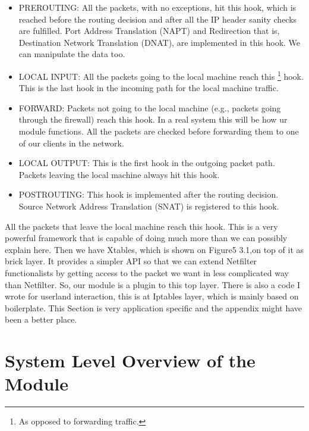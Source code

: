\documentclass[11pt,left=2cm,bottom=2cm,oneside]{book}
\begin{document}
\begin{itemize}
\item PREROUTING: All the packets, with no exceptions, hit this hook, which
is reached before the routing decision and after all the IP header sanity
checks are fulfilled. Port Address Translation (NAPT) and Redirection
that is, Destination Network Translation (DNAT), are implemented in
this hook. We can manipulate the data too.
\item LOCAL INPUT: All the packets going to the local machine reach this
\footnote{As opposed to forwarding traffic.}
hook. This is the last hook in the incoming path for the local machine
traffic.
\item FORWARD: Packets not going to the local machine (e.g., packets going
through the firewall) reach this hook. In a real system this will be how
ur module functions. All the packets are checked before forwarding them
to one of our clients in the network.
\item LOCAL OUTPUT: This is the first hook in the outgoing packet path.
Packets leaving the local machine always hit this hook.
\item POSTROUTING: This hook is implemented after the routing decision.
Source Network Address Translation (SNAT) is registered to this hook.
\end{itemize}
All the packets that leave the local machine reach this hook.
 This is a very powerful framework that is capable of doing much more than
we can possibly explain here. Then we have Xtables, which is shown on Figure5
3.1,on top of it as brick layer. It provides a simpler API so that we can extend
Netfilter functionalists by getting access to the packet we want in less complicated
way than Netfilter. So, our module is a plugin to this top layer. There is also a code
I wrote for userland interaction, this is at Iptables layer, which is mainly based on
boilerplate. This Section is very application specific and the appendix might have
been a better place.
\section{System Level Overview of the Module}
\end{document}
